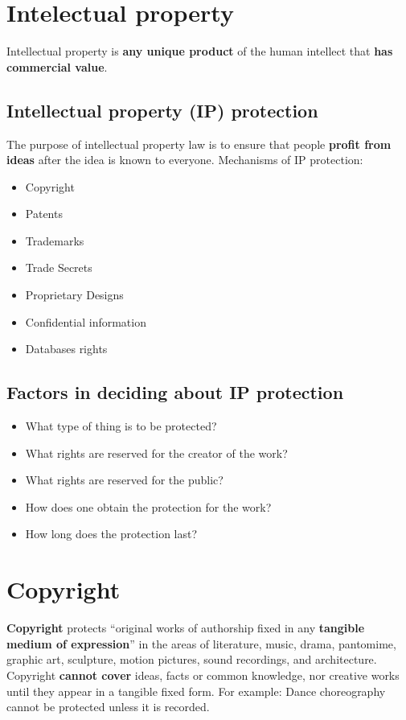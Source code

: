 \documentclass{article}
\begin{document}
\tableofcontents

\newpage

\section{Intelectual property}

\begin{flushleft}
Intellectual property is \textbf{any unique product} of the human intellect that \textbf{has commercial value}.
\end{flushleft}

\subsection{Intellectual property (IP) protection}
\begin{flushleft}
The purpose of intellectual property law is to ensure that people \textbf{profit from ideas} after the idea is known to everyone. Mechanisms of IP protection:
\begin{itemize}
  \item Copyright
  \item Patents 
  \item Trademarks
  \item Trade Secrets
  \item Proprietary Designs
  \item Confidential information
  \item Databases rights
\end{itemize}
\end{flushleft}

\subsection{Factors in deciding about IP protection}

\begin{itemize}
  \item What type of thing is to be protected?
  \item What rights are reserved for the creator of the work?
  \item What rights are reserved for the public?
  \item How does one obtain the protection for the work?
  \item How long does the protection last?
\end{itemize}

\section{Copyright}
\begin{flushleft}
\textbf{Copyright} protects “original works of authorship fixed in any \textbf{tangible medium of expression}” in the areas of literature, music, drama, pantomime, graphic art, sculpture, motion pictures, sound recordings, and architecture. Copyright \textbf{cannot cover} ideas, facts or common knowledge, nor creative works until they appear in a tangible fixed form. For example: Dance choreography cannot be protected unless it is recorded.
\end{flushleft}
\end{document}
